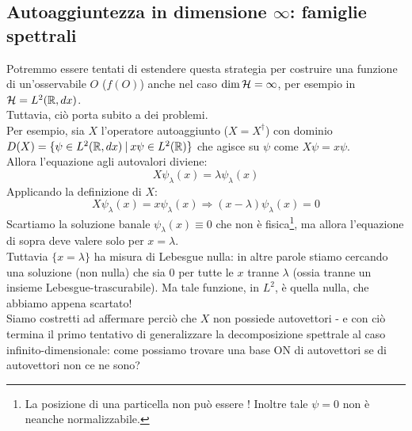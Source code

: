 \documentclass[../../FisicaTeorica.tex]{subfiles}
\begin{document}
\subsection{Autoaggiuntezza in dimensione $\infty$: famiglie spettrali}
Potremmo essere tentati di estendere questa strategia per costruire una funzione di un'osservabile $O$ ($f(O)$) anche nel caso $\operatorname{dim}\mathcal{H} = \infty$, per esempio in $\mathcal{H} = L^2(\mathbb{R}, dx)$.\\
Tuttavia, ciò porta subito a dei problemi.\\
Per esempio, sia $X$ l'operatore autoaggiunto ($X=X^\dag$) con dominio $D(X) = \{\psi \in L^2(\mathbb{R}, dx)\>|\>x\psi \in L^2(\mathbb{R})\}$ che agisce su $\psi$ come $X\psi = x\psi$.\\
Allora l'equazione agli autovalori diviene:
\[
X\psi_\lambda (x) = \lambda \psi_\lambda (x)
\]
Applicando la definizione di $X$:
\[
X\psi_\lambda(x) = x\psi_\lambda(x) \Rightarrow (x-\lambda)\psi_\lambda (x) = 0
\]
Scartiamo la soluzione banale $\psi_\lambda(x) \equiv 0$ che non è fisica\footnote{La posizione di una particella non può essere ! Inoltre tale $\psi = 0$ non è neanche normalizzabile.}, ma allora l'equazione di sopra deve valere solo per $x = \lambda$.\\
Tuttavia $\{x = \lambda \}$ ha misura di Lebesgue nulla: in altre parole stiamo cercando una soluzione (non nulla) che sia $0$ per tutte le $x$ tranne $\lambda$ (ossia tranne un insieme Lebesgue-trascurabile). Ma tale funzione, in $L^2$, è quella nulla, che abbiamo appena scartato!\\
Siamo costretti ad affermare perciò che $X$ non possiede autovettori - e con ciò termina il primo tentativo di generalizzare la decomposizione spettrale al caso infinito-dimensionale: come possiamo trovare una base ON di autovettori se di autovettori non ce ne sono?\\
\end{document}
